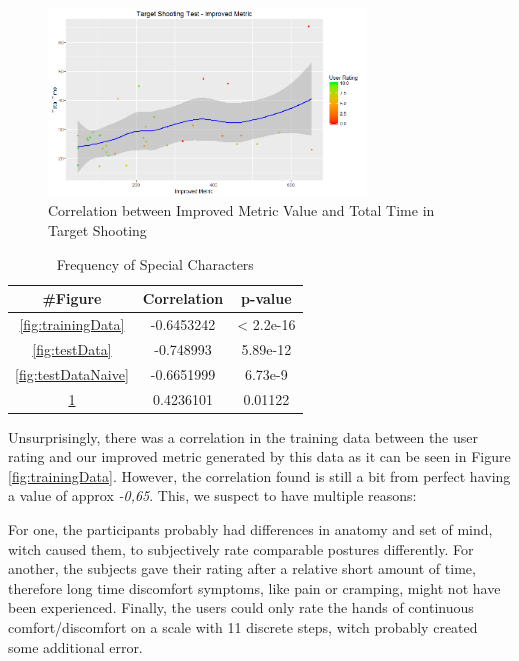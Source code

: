 \documentclass{sig-alternate-05-2015}
\begin{document}
\begin{figure}
\centering
\includegraphics[width=8.45cm]{targetShootingImproved}
\vspace{-20pt}
\caption{Correlation between Improved Metric Value and Total Time in Target Shooting}
\label{fig:targetShooting}
\vspace{-10pt}
\end{figure}

\begin{table}
\centering
\begin{tabular}{|c|c|c|} \hline
\#Figure & Correlation & p-value\\ \hline
\ref{fig:trainingData} & -0.6453242 & < 2.2e-16\\ \hline
\ref{fig:testData} & -0.748993 & 5.89e-12\\ \hline
\ref{fig:testDataNaive} & -0.6651999 & 6.73e-9\\ \hline
\ref{fig:targetShooting} & 0.4236101 & 0.01122\\ \hline
\end{tabular}
\caption{Frequency of Special Characters}
\label{tab:correlations}
\end{table}

Unsurprisingly, there was a correlation in the training data between the user rating and our improved metric generated by this data as it can be seen in Figure \ref{fig:trainingData}. However, the correlation found is still a bit from perfect having a value of approx \textsl{-0,65}. This, we  suspect  to have  multiple  reasons: 

For one, the participants probably had differences in anatomy and set of mind, witch caused them, to subjectively rate comparable postures differently. For another, the subjects gave their rating after a relative short amount of time, therefore long time discomfort symptoms, like pain or cramping, might not have been experienced. Finally, the users could only rate the hands of continuous comfort/discomfort on a scale with 11 discrete steps, witch probably created some additional error.
\end{document}
